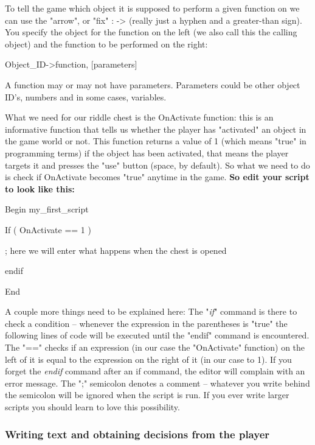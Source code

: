 \documentclass[
]{article}
\begin{document}
To tell the game which object it is supposed to perform a given function
on we can use the "arrow", or "fix" : -\textgreater{} (really just a
hyphen and a greater-than sign). You specify the object for the function
on the left (we also call this the calling object) and the function to
be performed on the right:

Object\_ID-\textgreater function, {[}parameters{]}

A function may or may not have parameters. Parameters could be other
object ID's, numbers and in some cases, variables.

What we need for our riddle chest is the OnActivate function: this is an
informative function that tells us whether the player has "activated" an
object in the game world or not. This function returns a value of 1
(which means "true" in programming terms) if the object has been
activated, that means the player targets it and presses the "use" button
(space, by default). So what we need to do is check if OnActivate
becomes "true" anytime in the game. \textbf{So edit your script to look
like this:}

Begin my\_first\_script

If ( OnActivate == 1 )

; here we will enter what happens when the chest is opened

endif

End

A couple more things need to be explained here: The "\emph{if}" command
is there to check a condition -- whenever the expression in the
parentheses is "true" the following lines of code will be executed until
the "endif" command is encountered. The "==" checks if an expression (in
our case the "OnActivate" function) on the left of it is equal to the
expression on the right of it (in our case to 1). If you forget the
\emph{endif} command after an if command, the editor will complain with
an error message. The ";" semicolon denotes a comment -- whatever you
write behind the semicolon will be ignored when the script is run. If
you ever write larger scripts you should learn to love this possibility.

\hypertarget{writing-text-and-obtaining-decisions-from-the-player}{%
\subsubsection{Writing text and obtaining decisions from the
player}\label{writing-text-and-obtaining-decisions-from-the-player}}
\end{document}
